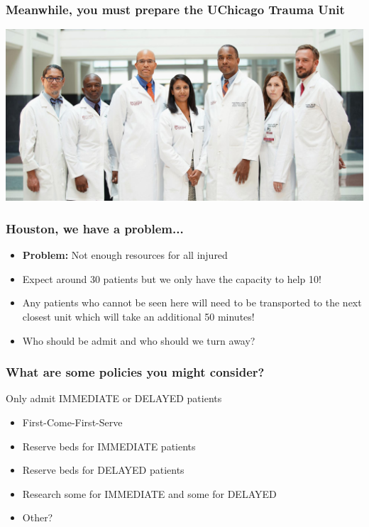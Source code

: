 \documentclass{beamer}
\begin{document}
\begin{frame}
  \frametitle{Meanwhile, you must prepare the UChicago Trauma Unit}
  \includegraphics[width=1\textwidth]{uchicago_trama}
\end{frame}

\begin{frame}
  \frametitle{Houston, we have a problem...}
  \begin{itemize}
    \item \textbf{Problem:} Not enough resources for all injured
    \item Expect around 30 patients but we only have the capacity to help 10!\pause
    \item Any patients who cannot be seen here will need to be transported to the next closest unit which will take an additional 50 minutes!\pause
    \item Who should be admit and who should we turn away?
  \end{itemize}
\end{frame}

\begin{frame}
  \frametitle{What are some policies you might consider?}
  \pause
  Only admit IMMEDIATE or DELAYED patients
  \pause
  \begin{itemize}
    \item First-Come-First-Serve
    \item Reserve beds for IMMEDIATE patients
    \item Reserve beds for DELAYED patients
    \item Research some for IMMEDIATE and some for DELAYED
    \item Other?
  \end{itemize}
\end{frame}
\end{document}
